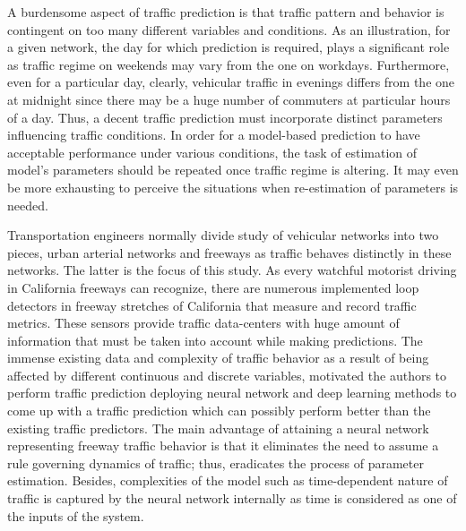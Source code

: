\documentclass[twocolumn,10pt]{asme2e}
\begin{document}
A burdensome aspect of traffic prediction is that traffic pattern and behavior is contingent on too many different variables and conditions. As an illustration, for a given network, the day for which prediction is required, plays a significant role as traffic regime on weekends may vary from the one on workdays. Furthermore, even for a particular day, clearly, vehicular traffic in evenings differs from the one at midnight since there may be a huge number of commuters at particular hours of a day. Thus, a decent traffic prediction must incorporate distinct parameters influencing traffic conditions. In order for a model-based prediction to have acceptable performance under various conditions, the task of estimation of model's parameters should be repeated once traffic regime is altering. It may even be more exhausting to perceive the situations when re-estimation of parameters is needed. 

Transportation engineers normally divide study of vehicular networks into two pieces, urban arterial networks and freeways as traffic behaves distinctly in these networks. The latter is the focus of this study. 
As every watchful motorist driving in California freeways can recognize, there are numerous implemented loop detectors in freeway stretches of California that measure and record traffic metrics. These sensors provide traffic data-centers with huge amount of information that must be taken into account while making predictions. The immense existing data and complexity of traffic behavior as a result of being affected by different continuous and discrete variables, motivated the authors to perform traffic prediction deploying neural network and deep learning methods to come up with a traffic prediction which can possibly perform better than the existing traffic predictors\cite{NNreview}. The main advantage of attaining a neural network representing freeway traffic behavior is that it eliminates the need to assume a rule governing dynamics of traffic; thus, eradicates the process of parameter estimation. Besides, complexities of the model such as time-dependent nature of traffic is captured by the neural network internally as time is considered as one of the inputs of the system. 
\end{document}
